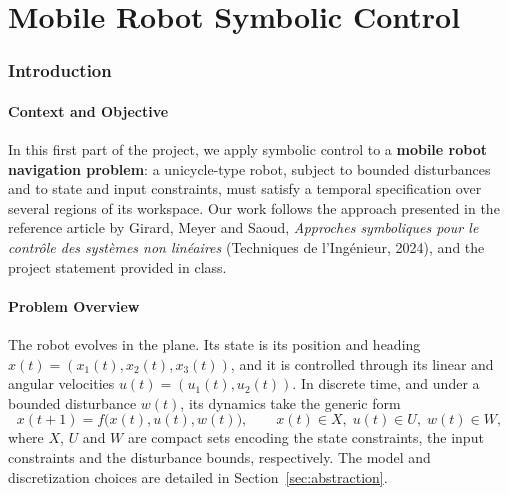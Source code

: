 \documentclass[11pt,a4paper]{article}
\begin{document}
\part{Mobile Robot Symbolic Control}
\label{part:mobile-robot}

\section{Introduction}

\subsection{Context and Objective}

In this first part of the project, we apply symbolic control to a \textbf{mobile robot navigation problem}: a
unicycle-type robot, subject to bounded disturbances and to state and input constraints, must
satisfy a temporal specification over several regions of its workspace. Our work follows the
approach presented in the reference article by Girard, Meyer and Saoud,
\emph{Approches symboliques pour le contr\^ole des syst\`emes non lin\'eaires}
(Techniques de l'Ing\'enieur, 2024), and the project statement provided in class.

\subsection{Problem Overview}

The robot evolves in the plane. Its state is its position and heading
$x(t)=(x_1(t),x_2(t),x_3(t))$, and it is controlled through its linear and angular velocities
$u(t)=(u_1(t),u_2(t))$. In discrete time, and under a bounded disturbance $w(t)$, its dynamics take the
generic form
\begin{equation}
  x(t+1) = f\big(x(t),u(t),w(t)\big),\qquad x(t)\in X,\; u(t)\in U,\; w(t)\in W,
\end{equation}
where $X$, $U$ and $W$ are compact sets encoding the state constraints, the input
constraints and the disturbance bounds, respectively. The model and discretization choices
are detailed in Section~\ref{sec:abstraction}.
\end{document}
